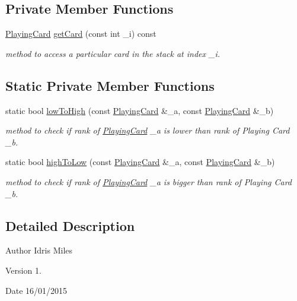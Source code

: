 \subsection*{Private Member Functions}
\begin{DoxyCompactItemize}
\item 
\hyperlink{classPlayingCard}{Playing\-Card} \hyperlink{classcardStack_a90bb8b2932df8cc4309e71f4acd5c4c0}{get\-Card} (const int \-\_\-i) const 
\begin{DoxyCompactList}\small\item\em method to access a particular card in the stack at index \-\_\-i. \end{DoxyCompactList}\end{DoxyCompactItemize}
\subsection*{Static Private Member Functions}
\begin{DoxyCompactItemize}
\item 
static bool \hyperlink{classcardStack_a687e7be25a00b5f00f673adccb2a033a}{low\-To\-High} (const \hyperlink{classPlayingCard}{Playing\-Card} \&\-\_\-a, const \hyperlink{classPlayingCard}{Playing\-Card} \&\-\_\-b)
\begin{DoxyCompactList}\small\item\em method to check if rank of \hyperlink{classPlayingCard}{Playing\-Card} \-\_\-a is lower than rank of Playing Card \-\_\-b. \end{DoxyCompactList}\item 
static bool \hyperlink{classcardStack_a09187668decae078e6ca2c6887d69e63}{high\-To\-Low} (const \hyperlink{classPlayingCard}{Playing\-Card} \&\-\_\-a, const \hyperlink{classPlayingCard}{Playing\-Card} \&\-\_\-b)
\begin{DoxyCompactList}\small\item\em method to check if rank of \hyperlink{classPlayingCard}{Playing\-Card} \-\_\-a is bigger than rank of Playing Card \-\_\-b. \end{DoxyCompactList}\end{DoxyCompactItemize}


\subsection{Detailed Description}
\begin{DoxyAuthor}{Author}
Idris Miles 
\end{DoxyAuthor}
\begin{DoxyVersion}{Version}
1. 
\end{DoxyVersion}
\begin{DoxyDate}{Date}
16/01/2015 
\end{DoxyDate}


